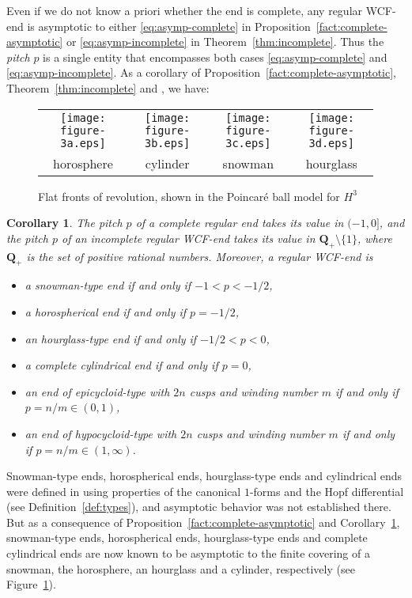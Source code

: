 \documentclass[a4paper]{amsart}
\theoremstyle{plain}
\newtheorem{introcorollary}[introtheorem]{Corollary}
\theoremstyle{remark}
\numberwithin{equation}{section}
\begin{document}
Even if we do not know a priori whether the end is complete, 
any regular WCF-end is asymptotic to either 
\eqref{eq:asymp-complete} in 
Proposition~\ref{fact:complete-asymptotic} or 
\eqref{eq:asymp-incomplete} in Theorem~\ref{thm:incomplete}. 
Thus the {\it pitch\/} $p$ is a single entity that encompasses 
both cases \eqref{eq:asymp-complete} and \eqref{eq:asymp-incomplete}.  
As a corollary of Proposition~\ref{fact:complete-asymptotic},
Theorem~\ref{thm:incomplete} and \cite[Propositions 3.1 and 7.3]{KRUY},
we have: 
\begin{figure}
\footnotesize
\begin{center}
 \begin{tabular}{c@{}c@{}c@{}c}
  \texttt{[image: figure-3a.eps]}&
  \texttt{[image: figure-3b.eps]}&
  \texttt{[image: figure-3c.eps]}&
  \texttt{[image: figure-3d.eps]}\\
  horosphere &
  cylinder &
  snowman &
  hourglass
 \end{tabular}
\end{center}
\caption{Flat fronts of revolution, shown in the Poincar\'e ball 
         model for $H^3$}\label{fig:revolution}
\end{figure}
\begin{introcorollary}\label{cor:ends}
 The pitch $p$ of a complete regular end takes its value in $(-1,0]$, 
 and the pitch $p$ of an incomplete regular WCF-end
 takes its value in 
 ${\boldsymbol{Q}}_{+}\setminus\{1\}$, where ${\boldsymbol{Q}}_+$ is the set of 
 positive rational numbers.
 Moreover, a regular WCF-end is 
 \begin{itemize}
 \item a snowman-type end if and only if $-1<p<-1/2$, 
 \item a horospherical end if and only if $p=-1/2$,
 \item an hourglass-type end if and only if $-1/2<p<0$,
 \item a complete cylindrical end if and only if $p=0$,
 \item an end of epicycloid-type with 
       $2n$ cusps and winding number $m$ if and only if $p=n/m\in (0,1)$, 
 \item 	an end of hypocycloid-type with 
	$2n$ cusps and winding number $m$
       if and only if $p=n/m\in (1,\infty)$.
 \end{itemize}
\end{introcorollary}
Snowman-type ends, horospherical ends, 
hourglass-type ends and cylindrical ends were defined in \cite{KRUY} 
using properties of the canonical $1$-forms and the Hopf differential
(see Definition~\ref{def:types}), and asymptotic behavior was not 
established there.  
But as a consequence of  Proposition~\ref{fact:complete-asymptotic} and
Corollary~\ref{cor:ends},
snowman-type ends, horospherical ends, hourglass-type ends and complete
cylindrical ends are now known to be 
asymptotic to the finite covering of a snowman, 
the horosphere, an hourglass and a cylinder, respectively 
{\rm (}see Figure~{\rm \ref{fig:revolution})}.
\end{document}
